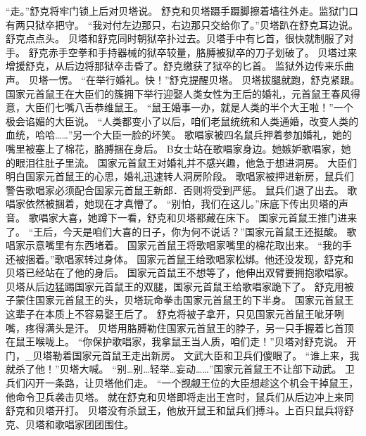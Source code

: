\documentclass[a4paper,12pt,UTF8,twoside]{ctexbook}
\begin{document}
        “走。”舒克将牢门锁上后对贝塔说。  
        舒克和贝塔蹑手蹑脚擦着墙往外走。监狱门口有两只狱卒把守。  
        “我对付左边那只，右边那只交给你了。”贝塔趴在舒克耳边说。  
        舒克点点头。  
        贝塔和舒克同时朝狱卒扑过去。贝塔手中有匕首，很快就制服了对手。  
        舒克赤手空拳和手持器械的狱卒较量，胳膊被狱卒的刀子划破了。  
        贝塔过来增援舒克，从后边将那狱卒击昏了。舒克缴获了狱卒的匕首。  
        监狱外边传来乐曲声。  
        贝塔一愣。  
        “在举行婚礼。快！”舒克提醒贝塔。  
        贝塔拔腿就跑，舒克紧跟。  
        国家元首鼠王在大臣们的簇拥下举行迎娶人类女性为王后的婚礼，元首鼠王春风得意，大臣们七嘴八舌恭维鼠王。  
        “鼠王婚事一办，就是人类的半个大王啦！”一个极会谄媚的大臣说。  
        “人类都变小了以后，咱们老鼠统统和人类通婚，改变人类的血统，哈哈……”另一个大臣一脸的坏笑。  
        歌唱家被四名鼠兵押着参加婚礼，她的嘴里被塞上了棉花，胳膊捆在身后。  
        B女士站在歌唱家身边。她嫉妒歌唱家，她的眼泪往肚子里流。  
        国家元首鼠王对婚礼并不感兴趣，他急于想进洞房。  
        大臣们明白国家元首鼠王的心思，婚礼迅速转人洞房阶段。  
        歌唱家被押进新房，鼠兵们警告歌唱家必须配合国家元首鼠王新郎．否则将受到严惩。  
        鼠兵们退了出去。  
        歌唱家依然被捆着，她现在才真懵了。  
        “别怕，我们在这儿。”床底下传出贝塔的声音。  
        歌唱家大喜，她蹲下一看，舒克和贝塔都藏在床下。  
        国家元首鼠王推门进来了。  
        “王后，今天是咱们大喜的日子，你为何不说话？”国家元首鼠王还挺酸。  
        歌唱家示意嘴里有东西堵着。  
        国家元首鼠王将歌唱家嘴里的棉花取出来。  
        “我的手还被捆着。”歌唱家转过身体。  
        国家元首鼠王给歌唱家松绑。他还没发现，舒克和贝塔已经站在了他的身后。  
        国家元首鼠王不想等了，他伸出双臂要拥抱歌唱家。  
        贝塔从后边猛踢国家元首鼠王的双腿，国家元首鼠王给歌唱家跪下了。  
        舒克用被子蒙住国家元首鼠王的头，贝塔玩命拳击国家元首鼠王的下半身。  
        国家元首鼠王这辈子在本质上不容易娶王后了。  
        舒克将被子拿开，只见国家元首鼠王呲牙咧嘴，疼得满头是汗。  
        贝塔用胳膊勒住国家元首鼠王的脖子，另一只手握着匕首顶在鼠王喉咙上。  
        “你保护歌唱家，我拿鼠王当人质，咱们走！”贝塔对舒克说。  
        开门，_贝塔勒着国家元首鼠王走出新房。  
        文武大臣和卫兵们傻眼了。  
        “谁上来，我就杀了他！”贝塔大喊。  
        “别…别…轻举…妄动……”国家元首鼠王不让部下动武。  
        卫兵们闪开一条路，让贝塔他们走。  
        “一个觊觎王位的大臣想趁这个机会干掉鼠王，他命令卫兵袭击贝塔。  
        就在舒克和贝塔即将走出王宫时，鼠兵们从后边冲上来同舒克和贝塔开打。  
        贝塔没有杀鼠王，他放开鼠王和鼠兵们搏斗。上百只鼠兵将舒克、贝塔和歌唱家团团围住。  
\end{document}
